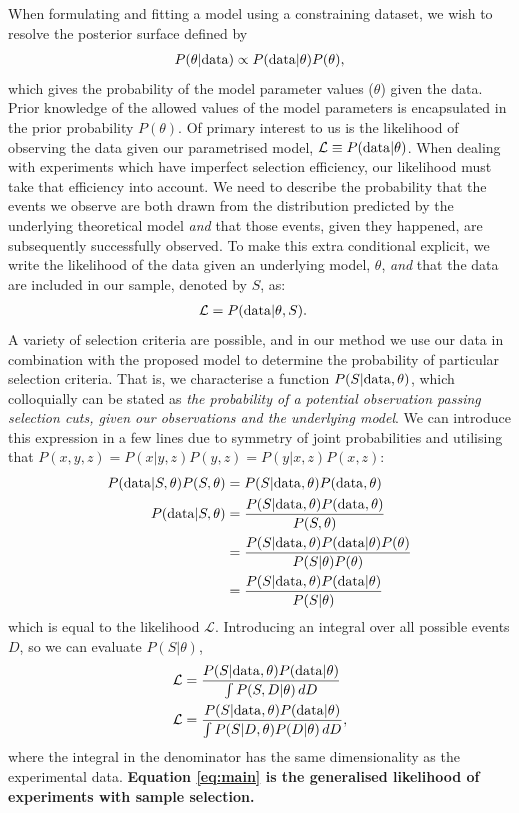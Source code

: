 \documentclass[a4paper,fleqn,usenatbib]{mnras}
\begin{document}
When formulating and fitting a model using a constraining dataset, we wish to resolve the posterior surface defined by
\begin{align}
P(\theta | {\rm data}) \propto P({\rm data} | \theta) P(\theta),
\end{align}
which gives the probability of the model parameter values ($\theta$) given the data.  Prior knowledge of the allowed values of the model parameters is encapsulated in the prior probability $P(\theta)$. Of primary interest to us is the likelihood of observing the data given our parametrised model, $\mathcal{L} \equiv P({\rm data} | \theta)$. When dealing with experiments which have imperfect selection efficiency, our likelihood must take that efficiency into account.  We need to describe the probability that the events we observe are both drawn from the distribution predicted by the underlying theoretical model \textit{and} that those events, given they happened, are subsequently successfully observed.  To make this extra conditional explicit, we write the likelihood of the data given an underlying model, $\theta$, \textit{and} that the data are included in our sample, denoted by $S$, as:
\begin{align}
\mathcal{L} &= P({\rm data} | \theta, S). \label{eq:like}
\end{align}
A variety of selection criteria are possible, and in our method we use our data in combination with the proposed model to determine the probability of particular selection criteria.  That is, we characterise a function $P(S|{\rm data},\theta)$, which colloquially can be stated as \textit{the probability of a potential observation passing selection cuts, given our observations and the underlying model}. We can introduce this expression in a few lines due to symmetry of joint probabilities and utilising that $P(x,y,z) = P(x|y,z)P(y,z) = P(y|x, z)P(x, z)$:
\begin{align}
P({\rm data} | S , \theta) P(S, \theta) &= P(S | {\rm data}, \theta) P({\rm data}, \theta)\\
P({\rm data} | S , \theta) &= \frac{ P(S | {\rm data}, \theta) P({\rm data}, \theta) }{ P(S, \theta) }\\
 &= \frac{ P(S | {\rm data}, \theta) P({\rm data} | \theta) P(\theta)}{ P(S | \theta)  P(\theta)}\\
 &= \frac{ P(S | {\rm data}, \theta) P({\rm data} | \theta)}{ P(S | \theta) }
\end{align}
which is equal to the likelihood $\mathcal{L}$. Introducing an integral over all possible events $D$, so we can evaluate $P(S|\theta)$, 
\begin{align}
\mathcal{L}&= \frac{P(S|{\rm data},\theta) P({\rm data}|\theta)}{\int P(S, D|\theta)\, dD} \\
\mathcal{L} &= \frac{P(S|{\rm data},\theta) P({\rm data}|\theta)}{\int P(S | D, \theta) P(D|\theta)\, dD}, \label{eq:main}
\end{align}
where the integral in the denominator has the same dimensionality as the experimental data. \textbf{Equation \ref{eq:main} is the generalised likelihood of experiments with sample selection.}
\end{document}
